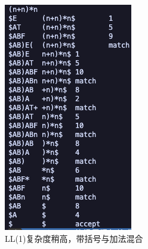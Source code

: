 \begin{figure}[htbp]
    \centering
    \begin{minipage}[t]{0.3\textwidth}
        \centering
        \includegraphics[width=\textwidth]{images/ll_4.png}
        \caption{LL(1)复杂度稍高，带括号与加法混合}
        \label{fig:ll-4}
    \end{minipage}
    \begin{minipage}[t]{0.3\textwidth}
        \centering

\end{minipage}
\end{figure}
